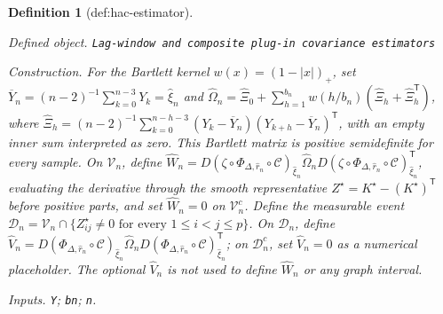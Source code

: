 \documentclass{article}
\newtheorem{definition}{Definition}
\begin{document}
\begin{definition}[def:hac-estimator]\label{def:hac-estimator}
\par\smallskip\noindent\emph{Defined object.} \texttt{Lag-\allowbreak{}window and composite plug-\allowbreak{}in covariance estimators}
\par\smallskip\noindent\emph{Construction.} For the Bartlett kernel \(w(x)=(1-|x|)_+\), set \(\overline Y_n=(n-2)^{-1}\sum_{k=0}^{n-3}Y_k=\widehat\xi_n\) and \(\widehat\Omega_n=\widehat\Xi_0+\sum_{h=1}^{b_n}w(h/b_n)(\widehat\Xi_h+\widehat\Xi_h^{\mathsf T})\), where \(\widehat\Xi_h=(n-2)^{-1}\sum_{k=0}^{n-h-3}(Y_k-\overline Y_n)(Y_{k+h}-\overline Y_n)^{\mathsf T}\), with an empty inner sum interpreted as zero. This Bartlett matrix is positive semidefinite for every sample. On \(\mathcal V_n\), define \(\widehat W_n=D(\zeta\circ\Phi_{\Delta,\widehat r_n}\circ\mathcal C)_{\widehat\xi_n}\widehat\Omega_nD(\zeta\circ\Phi_{\Delta,\widehat r_n}\circ\mathcal C)_{\widehat\xi_n}^{\mathsf T}\), evaluating the derivative through the smooth representative \(Z^\star=K^\star-(K^\star)^{\mathsf T}\) before positive parts, and set \(\widehat W_n=0\) on \(\mathcal V_n^c\). Define the measurable event \(\mathcal D_n=\mathcal V_n\cap\{Z_{ij}^\star\neq0\text{ for every }1\leq i<j\leq p\}\). On \(\mathcal D_n\), define \(\widehat V_n=D(\Phi_{\Delta,\widehat r_n}\circ\mathcal C)_{\widehat\xi_n}\widehat\Omega_nD(\Phi_{\Delta,\widehat r_n}\circ\mathcal C)_{\widehat\xi_n}^{\mathsf T}\); on \(\mathcal D_n^c\), set \(\widehat V_n=0\) as a numerical placeholder. The optional \(\widehat V_n\) is not used to define \(\widehat W_n\) or any graph interval.
\par\smallskip\noindent\emph{Inputs.} \texttt{Y}; \texttt{bn}; \texttt{n}.
\end{definition}
\end{document}
